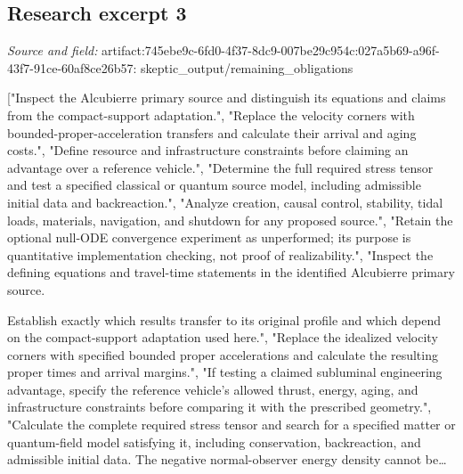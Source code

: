 \documentclass[11pt]{article}
\begin{document}
\subsection{Research excerpt 3}
\textit{Source and field: }artifact:745ebe9c-6fd0-4f37-8dc9-007be29c954c:027a5b69-a96f-43f7-91ce-60af8ce26b57: skeptic\_output/remaining\_obligations\par
["Inspect the Alcubierre primary source and distinguish its equations and claims from the compact-support adaptation.", "Replace the velocity corners with bounded-proper-acceleration transfers and calculate their arrival and aging costs.", "Define resource and infrastructure constraints before claiming an advantage over a reference vehicle.", "Determine the full required stress tensor and test a specified classical or quantum source model, including admissible initial data and backreaction.", "Analyze creation, causal control, stability, tidal loads, materials, navigation, and shutdown for any proposed source.", "Retain the optional null-ODE convergence experiment as unperformed; its purpose is quantitative implementation checking, not proof of realizability.", "Inspect the defining equations and travel-time statements in the identified Alcubierre primary source.

Establish exactly which results transfer to its original profile and which depend on the compact-support adaptation used here.", "Replace the idealized velocity corners with specified bounded proper accelerations and calculate the resulting proper times and arrival margins.", "If testing a claimed subluminal engineering advantage, specify the reference vehicle's allowed thrust, energy, aging, and infrastructure constraints before comparing it with the prescribed geometry.", "Calculate the complete required stress tensor and search for a specified matter or quantum-field model satisfying it, including conservation, backreaction, and admissible initial data. The negative normal-observer energy density cannot be…
\end{document}
